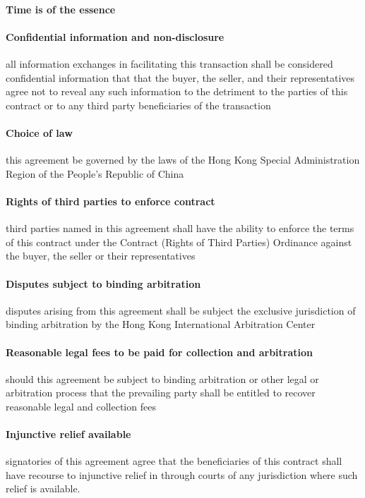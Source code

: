 \documentclass[10pt]{article}
\begin{document}
\paragraph{Time is of the essence}

\paragraph{Confidential information and non-disclosure} all
information exchanges in facilitating this transaction shall be
considered confidential information that that the buyer, the seller,
and their representatives agree not to reveal any such information to the
detriment to the parties of this contract or to any third party
beneficiaries of the transaction

\paragraph{Choice of law} this agreement be governed by the laws of the Hong Kong Special Administration Region of the People’s Republic of China


\paragraph{Rights of third parties to enforce contract} third parties named in this agreement shall have the ability to enforce the terms of this contract under the Contract (Rights of Third Parties) Ordinance against the buyer, the seller or their representatives

\paragraph{Disputes subject to binding arbitration} disputes arising from this agreement shall be subject the exclusive
jurisdiction of binding arbitration by the Hong Kong International
Arbitration Center

\paragraph{Reasonable legal fees to be paid for collection and
  arbitration} should this agreement be subject to binding arbitration
or other legal or arbitration process that the prevailing party shall
be entitled to recover reasonable legal and collection fees

\paragraph{Injunctive relief available} signatories of this agreement agree that the beneficiaries of this contract shall have recourse to injunctive relief in through courts of any jurisdiction where such relief is available.
\end{document}
